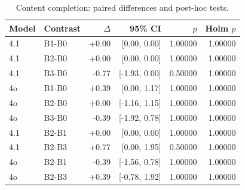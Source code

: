 \begin{table}[!t]
\caption{Content completion: paired differences and post-hoc tests.}
\label{tab:content-tests}
\centering\scriptsize
\begin{tabular}{llrrrr}
\toprule
Model & Contrast & $\Delta$ & 95\% CI & $p$ & Holm $p$ \\
\midrule

4.1 & B1-B0 & +0.00 & [0.00, 0.00] & 1.00000 & 1.00000 \\

4.1 & B2-B0 & +0.00 & [0.00, 0.00] & 1.00000 & 1.00000 \\

4.1 & B3-B0 & -0.77 & [-1.93, 0.00] & 0.50000 & 1.00000 \\

4o & B1-B0 & +0.39 & [0.00, 1.17] & 1.00000 & 1.00000 \\

4o & B2-B0 & +0.00 & [-1.16, 1.15] & 1.00000 & 1.00000 \\

4o & B3-B0 & -0.39 & [-1.92, 0.78] & 1.00000 & 1.00000 \\

4.1 & B2-B1 & +0.00 & [0.00, 0.00] & 1.00000 & 1.00000 \\

4.1 & B2-B3 & +0.77 & [0.00, 1.95] & 0.50000 & 1.00000 \\

4o & B2-B1 & -0.39 & [-1.56, 0.78] & 1.00000 & 1.00000 \\

4o & B2-B3 & +0.39 & [-0.78, 1.92] & 1.00000 & 1.00000 \\

\bottomrule
\end{tabular}
\end{table}

